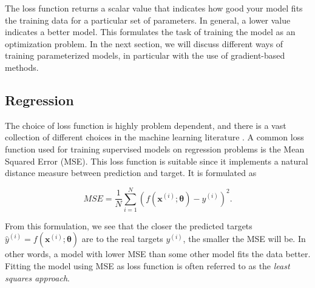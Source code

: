 The loss function returns a scalar value that indicates how good your model fits the training data for a particular set of parameters. In general, a lower value indicates a better model. This formulates the task of training the model as an optimization problem. In the next section, we will discuss different ways of training parameterized models, in particular with the use of gradient-based methods.

\subsection{Regression}\label{sec:Regression}

The choice of loss function is highly problem dependent, and there is a vast collection of different choices in the machine learning literature \cite{hastie01statisticallearning}. A common loss function used for training supervised models on regression problems is the Mean Squared Error (MSE). This loss function is suitable since it implements a natural distance measure between prediction and target. It is formulated as

\begin{equation}\label{eq:MSE}
    MSE = \frac{1}{N}\sum_{i=1}^{N} (f(\boldsymbol{x}^{(i)}; \boldsymbol{\theta}) - y^{(i)})^2.
\end{equation}

From this formulation, we see that the closer the predicted targets $\hat{y}^{(i)} = f(\boldsymbol{x}^{(i)}; \boldsymbol{\theta})$ are to the real targets $y^{(i)}$, the smaller the MSE will be. In other words, a model with lower MSE than some other model fits the data better. Fitting the model using MSE as loss function is often referred to as the \emph{least squares approach}.

